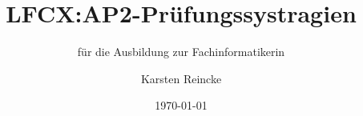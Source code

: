 \documentclass[]{beamer}
\title{LFCX:AP2-Prüfungssystragien}
\subtitle{für die Ausbildung zur Fachinformatikerin}
\institute{GS-LDK}
\author{Karsten Reincke}
\date{\today}
\def\cfgGl{../../../cfg.gl/}
\begin{document}

\begin{frame}
  \titlepage
\end{frame}






\logo{}
\newpage

%

%
\end{document}

